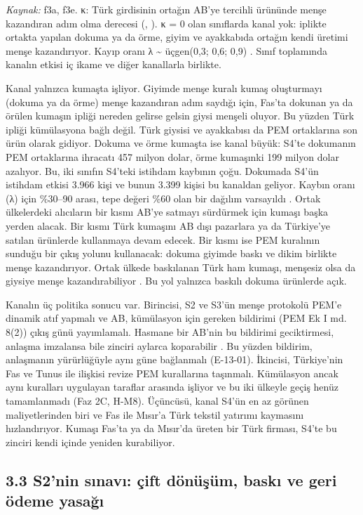 \emph{Kaynak:} \etiketT{} f3a, f3e. κ: Türk girdisinin ortağın AB'ye tercihli ürününde menşe kazandıran adım olma derecesi (, \etiketH{}). κ = 0 olan sınıflarda kanal yok: iplikte ortakta yapılan dokuma ya da örme, giyim ve ayakkabıda ortağın kendi üretimi menşe kazandırıyor. Kayıp oranı λ \textasciitilde{} üçgen(0,3; 0,6; 0,9) \etiketH{}. Sınıf toplamında kanalın etkisi iç ikame ve diğer kanallarla birlikte.

Kanal yalnızca kumaşta işliyor. Giyimde menşe kuralı kumaş oluşturmayı (dokuma ya da örme) menşe kazandıran adım saydığı için, Fas'ta dokunan ya da örülen kumaşın ipliği nereden gelirse gelsin giysi menşeli oluyor. Bu yüzden Türk ipliği kümülasyona bağlı değil. Türk giysisi ve ayakkabısı da PEM ortaklarına son ürün olarak gidiyor. Dokuma ve örme kumaşta ise kanal büyük: S4'te dokumanın PEM ortaklarına ihracatı 457 milyon dolar, örme kumaşınki 199 milyon dolar azalıyor. Bu, iki sınıfın S4'teki istihdam kaybının çoğu. Dokumada S4'ün istihdam etkisi 3.966 kişi ve bunun 3.399 kişisi bu kanaldan geliyor. Kaybın oranı (λ) için \%30--90 arası, tepe değeri \%60 olan bir dağılım varsayıldı \etiketH{}. Ortak ülkelerdeki alıcıların bir kısmı AB'ye satmayı sürdürmek için kumaşı başka yerden alacak. Bir kısmı Türk kumaşını AB dışı pazarlara ya da Türkiye'ye satılan ürünlerde kullanmaya devam edecek. Bir kısmı ise PEM kuralının sunduğu bir çıkış yolunu kullanacak: dokuma giyimde baskı ve dikim birlikte menşe kazandırıyor. Ortak ülkede baskılanan Türk ham kumaşı, menşesiz olsa da giysiye menşe kazandırabiliyor \etiketV{}. Bu yol yalnızca baskılı dokuma ürünlerde açık.

Kanalın üç politika sonucu var. Birincisi, S2 ve S3'ün menşe protokolü PEM'e dinamik atıf yapmalı ve AB, kümülasyon için gereken bildirimi (PEM Ek I md. 8(2)) çıkış günü yayımlamalı. Hasmane bir AB'nin bu bildirimi geciktirmesi, anlaşma imzalansa bile zinciri aylarca koparabilir \etiketH{}. Bu yüzden bildirim, anlaşmanın yürürlüğüyle aynı güne bağlanmalı (E-13-01). İkincisi, Türkiye'nin Fas ve Tunus ile ilişkisi revize PEM kurallarına taşınmalı. Kümülasyon ancak aynı kuralları uygulayan taraflar arasında işliyor ve bu iki ülkeyle geçiş henüz tamamlanmadı (Faz 2C, H-M8). Üçüncüsü, kanal S4'ün en az görünen maliyetlerinden biri ve Fas ile Mısır'a Türk tekstil yatırımı kaymasını hızlandırıyor. Kumaşı Fas'ta ya da Mısır'da üreten bir Türk firması, S4'te bu zinciri kendi içinde yeniden kurabiliyor.

\hypertarget{nace_kartlar_13-15-33-s2nin-sux131navux131-uxe7ift-duxf6nuxfcux15fuxfcm-baskux131-ve-geri-uxf6deme-yasaux11fux131}{%
\subsection{3.3 S2'nin sınavı: çift dönüşüm, baskı ve geri ödeme yasağı}\label{nace_kartlar_13-15-33-s2nin-sux131navux131-uxe7ift-duxf6nuxfcux15fuxfcm-baskux131-ve-geri-uxf6deme-yasaux11fux131}}

